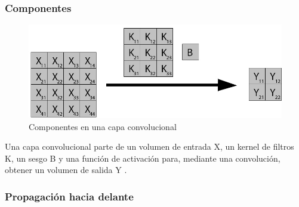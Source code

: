 \subsubsection{Componentes}


\begin{figure}[H]
	\centering
	\includegraphics[scale=0.35]{imagenes/conv_nombres.jpg}  
	\caption{Componentes en una capa convolucional}
	\label{fig:Componentes_convolucion}
\end{figure}

Una capa convolucional parte de un volumen de entrada X, un kernel de filtros K, un sesgo B y una función de activación para, mediante una convolución, obtener un volumen de salida Y \cite{capa_convolucional} \cite{capa_convolucional_Stanford}.

\subsubsection{Propagación hacia delante}

